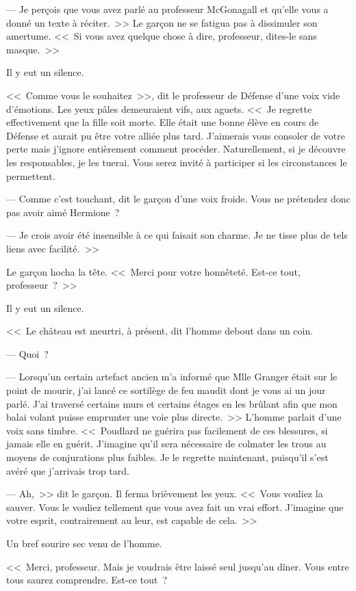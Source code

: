 --- Je perçois que vous avez parlé au professeur McGonagall et qu'elle vous a donné un texte à réciter.~>> Le garçon ne se fatigua pas à dissimuler son amertume. <<~Si vous avez quelque chose à dire, professeur, dites-le sans masque.~>>

Il y eut un silence.

<<~Comme vous le souhaitez~>>, dit le professeur de Défense d'une voix vide d'émotions. Les yeux pâles demeuraient vifs, aux aguets. <<~Je regrette effectivement que la fille soit morte. Elle était une bonne élève en cours de Défense et aurait pu être votre alliée plus tard. J'aimerais vous consoler de votre perte mais j'ignore entièrement comment procéder. Naturellement, si je découvre les responsables, je les tuerai. Vous serez invité à participer si les circonstances le permettent.

--- Comme c'est touchant, dit le garçon d'une voix froide. Vous ne prétendez donc pas avoir aimé Hermione~?

--- Je crois avoir été insensible à ce qui faisait son charme. Je ne tisse plus de tels liens avec facilité.~>>

Le garçon hocha la tête. <<~Merci pour votre honnêteté. Est-ce tout, professeur~?~>>

Il y eut un silence.

<<~Le château est meurtri, à présent, dit l'homme debout dans un coin.

--- Quoi~?

--- Lorsqu'un certain artefact ancien m'a informé que Mlle Granger était sur le point de mourir, j'ai lancé ce sortilège de feu maudit dont je vous ai un jour parlé. J'ai traversé certains murs et certains étages en les brûlant afin que mon balai volant puisse emprunter une voie plus directe.~>> L'homme parlait d'une voix sans timbre. <<~Poudlard ne guérira pas facilement de ces blessures, si jamais elle en guérit. J'imagine qu'il sera nécessaire de colmater les trous au moyens de conjurations plus faibles. Je le regrette maintenant, puisqu'il s'est avéré que j'arrivais trop tard.

--- Ah,~>> dit le garçon. Il ferma brièvement les yeux. <<~Vous vouliez la sauver. Vous le vouliez tellement que vous avez fait un vrai effort. J'imagine que votre esprit, contrairement au leur, est capable de cela.~>>

Un bref sourire sec venu de l'homme.

<<~Merci, professeur. Mais je voudrais être laissé seul jusqu'au dîner. Vous entre tous saurez comprendre. Est-ce tout~?

